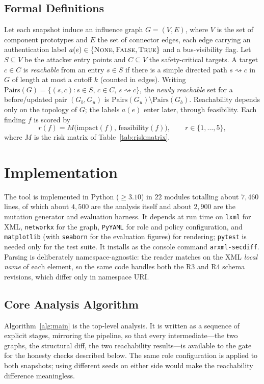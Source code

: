 \documentclass[journal]{IEEEtran}
\begin{document}
\subsection{Formal Definitions}
Let each snapshot induce an influence graph $G=(V,E)$, where $V$ is the set of
component prototypes and $E$ the set of connector edges, each edge carrying an
authentication label $a(e)\in\{\textsc{None},\textsc{False},\textsc{True}\}$ and
a bus-visibility flag. Let $S\subseteq V$ be the attacker entry points and
$C\subseteq V$ the safety-critical targets. A target $c\in C$ is
\emph{reachable} from an entry $s\in S$ if there is a simple directed path
$s\rightsquigarrow c$ in $G$ of length at most a cutoff $k$ (counted in edges).
Writing $\mathrm{Pairs}(G)=\{(s,c): s\in S,\, c\in C,\, s\rightsquigarrow c\}$,
the \emph{newly reachable} set for a before/updated pair $(G_b,G_u)$ is
$\mathrm{Pairs}(G_u)\setminus\mathrm{Pairs}(G_b)$. Reachability depends only on
the topology of $G$; the labels $a(e)$ enter later, through feasibility. Each
finding $f$ is scored by
\begin{equation}
\label{eq:risk}
r(f)=M\big(\mathrm{impact}(f),\,\mathrm{feasibility}(f)\big),\qquad r\in\{1,\dots,5\},
\end{equation}
where $M$ is the risk matrix of Table~\ref{tab:riskmatrix}.

\section{Implementation}
\label{sec:impl}

The tool is implemented in Python ($\geq 3.10$) in $22$ modules totalling about
$7{,}460$ lines, of which about $4{,}500$ are the analysis itself and about
$2{,}900$ are the mutation generator and evaluation harness. It depends at run
time on \texttt{lxml} for XML, \texttt{networkx} for the graph,
\texttt{PyYAML} for role and policy configuration, and \texttt{matplotlib} (with
\texttt{seaborn} for the evaluation figures) for rendering; \texttt{pytest} is
needed only for the test suite. It installs as the console command
\texttt{arxml-secdiff}. Parsing is deliberately namespace-agnostic: the reader
matches on the XML \emph{local name} of each element, so the same code handles
both the R3 and R4 schema revisions, which differ only in namespace URI.

\subsection{Core Analysis Algorithm}
Algorithm~\ref{alg:main} is the top-level analysis. It is written as a sequence
of explicit stages, mirroring the pipeline, so that every intermediate---the two
graphs, the structural diff, the two reachability results---is available to the
gate for the honesty checks described below. The same role configuration is
applied to both snapshots; using different seeds on either side would make the
reachability difference meaningless.
\end{document}
